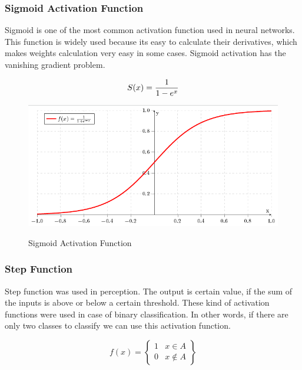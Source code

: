 \documentclass[12pt, a4paper]{report}
\begin{document}
\subsubsection{Sigmoid Activation Function}\label{sec:sigmoid}
Sigmoid is one of the most common activation function used in neural networks. This function is widely used because its easy to calculate their derivatives, which makes weights calculation very easy in some cases. Sigmoid activation has the vanishing gradient problem.\\ \par
\begin{equation}
S(x) = \frac{1}{1-e^{x}} \\
\label{eq:sig}
\end{equation}

\begin{figure}[h]
\centering	
\includegraphics[width=12cm]{sigmoid.png}\\
\caption{Sigmoid Activation Function}
\label{fig:sigmoid}
\end{figure} 	
\clearpage
\subsubsection{Step Function}\label{sec:step}
Step function was used in perception. The output is certain value, if the sum of the inputs is above or below a certain threshold. These kind of activation functions were used in case of binary classification. In other words, if there are only two classes to classify we can use this activation function.\\ \par
 \begin{equation}\label{eq:step}
f(x) = \begin{Bmatrix}
1 & x \in A \\ 
0 & x \notin A 
\end{Bmatrix}
\end{equation}
\end{document}
